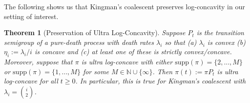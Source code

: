 \documentclass[10pt,oneside,reqno]{article}
\theoremstyle{plain}
\newtheorem{theorem}{Theorem}[section]
\theoremstyle{definition}
\numberwithin{equation}{section}
\renewcommand{\geq}{\geqslant}
\newcommand{\N}{\mathbb{N}}
\begin{document}
    \noindent The following shows us that Kingman's coalescent preserves log-concavity in our setting of interest.

\begin{theorem}[Preservation of Ultra Log-Concavity]
\noindent Suppose $P_t$ is the transition semigroup of a pure-death process with death rates $\lambda_i$ so that (a) $\lambda_i$ is convex (b) $\eta_i := \lambda_i/i$ is concave and (c) at least one of these is strictly convex/concave. Moreover, suppose that $\pi$ is ultra log-concave with either $\mathrm{supp}(\pi) = \{2,..., M\}$ or $\mathrm{supp}(\pi) = \{1,..., M\}$ for some $M \in \N \cup \{\infty\}$. Then $\pi(t) := \pi P_t$ is ultra log-concave for all $t \geq 0$. In particular, this is true for Kingman's coalescent with $\lambda_i = {i \choose 2}$. 
\label{thm:kingman_preserves_ultralogconcave}
\end{theorem}
\end{document}
